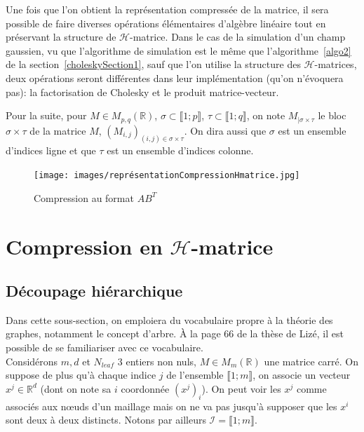 Une fois que l'on obtient la représentation compressée de la matrice, il sera possible de
faire diverses opérations élémentaires d'algèbre linéaire tout en préservant la
structure de $\mathcal{H}$-matrice. Dans le cas de la simulation d'un
champ gaussien, vu que l'algorithme de simulation est le même que l'algorithme~\ref{algo2} de la section~\ref{choleskySection1}, sauf que l'on utilise la structure des $\mathcal{H}$-matrices,
deux opérations seront différentes dans leur implémentation (qu'on n'évoquera pas): la factorisation de
Cholesky et le produit matrice-vecteur.

Pour la suite, pour $M \in M_{p,q}(\mathbb{R})$, $\sigma \subset \llbracket 1;p \rrbracket$,
$\tau \subset \llbracket 1;q \rrbracket$, on note $M_{|\sigma \times \tau}$ le
bloc $\sigma \times \tau$ de la matrice $M$, $(M_{i,j})_{(i,j) \in \sigma \times \tau}$. On dira aussi que $\sigma$ est un ensemble d'indices \og ligne\fg{} et que
$\tau$ est un ensemble d'indices \og colonne\fg{}.


\begin{figure}[h]
\begin{center}
\texttt{[image: images/représentationCompressionHmatrice.jpg]}
\caption{Compression au format $AB^{T}$}
\label{ideeCompressionHmatrice}  
\end{center}
\end{figure}

\section{Compression en $\mathcal{H}$-matrice}

\subsection{Découpage hiérarchique}

Dans cette sous-section, on emploiera du vocabulaire propre à la théorie
des graphes, notamment le concept d'arbre. \` A la page 66 de la thèse de Lizé,
il est possible de se familiariser avec ce vocabulaire.\\

Considérons $m,d$ et $N_{leaf}$ 3 entiers non nuls, $M \in M_{m}(\mathbb{R})$ une matrice carré. On suppose de plus qu'à chaque indice $j$ de l'ensemble
$\llbracket 1;m \rrbracket$, on associe un vecteur $x^j \in \mathbb{R}^d$ (dont on note sa $i$ coordonnée $(x^j)_i$).  On peut voir les $x^j$ comme associés aux n\oe uds d'un maillage mais
on ne va pas jusqu'à supposer que les $x^i$ sont deux à deux distincts.
Notons par ailleurs $\mathcal{I}=\llbracket 1;m \rrbracket$.


